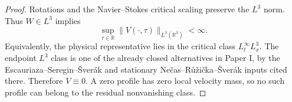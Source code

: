 \begin{proof}
Rotations and the Navier--Stokes critical scaling preserve the \(L^3\) norm.
Thus \(W\in L^3\) implies
\[
   \sup_{\tau\in\mathbb R}\|V(\cdot,\tau)\|_{L^3(\mathbb R^3)}<\infty .
\]
Equivalently, the physical representative lies in the critical class
\(L^\infty_tL^3_x\).  The endpoint \(L^3\) class is one of the already closed
alternatives in Paper I, by the Escauriaza--Seregin--\v Sver\'ak and stationary
Ne\v cas--R\r u\v zi\v cka--\v Sver\'ak inputs cited there.  Therefore
\(V\equiv0\).  A zero profile has zero local velocity mass, so no such profile
can belong to the residual
nonvanishing class.
\end{proof}
